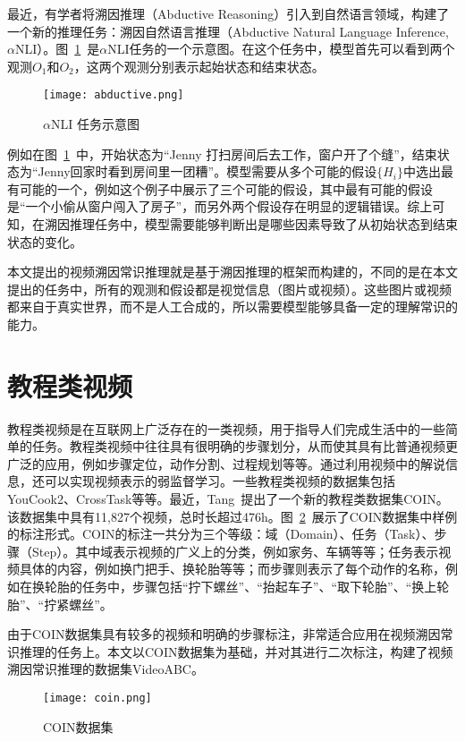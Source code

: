 最近，有学者将溯因推理（Abductive Reasoning）引入到自然语言领域，构建了一个新的推理任务：溯因自然语言推理\cite{bhagavatula2019abductive}（Abductive Natural Language Inference, $\alpha$NLI）。图~\ref{fig:aNLI}~是$\alpha$NLI任务的一个示意图。在这个任务中，模型首先可以看到两个观测$O_1$和$O_2$，这两个观测分别表示起始状态和结束状态。
\begin{figure}
    \centering
    \texttt{[image: abductive.png]}
    \caption{$\alpha$NLI 任务\cite{bhagavatula2019abductive}示意图}
    \label{fig:aNLI}
\end{figure}
例如在图~\ref{fig:aNLI}~中，开始状态为“Jenny 打扫房间后去工作，窗户开了个缝”，结束状态为“Jenny回家时看到房间里一团糟”。模型需要从多个可能的假设$\{H_i\}$中选出最有可能的一个，例如这个例子中展示了三个可能的假设，其中最有可能的假设是“一个小偷从窗户闯入了房子”，而另外两个假设存在明显的逻辑错误。综上可知，在溯因推理任务中，模型需要能够判断出是哪些因素导致了从初始状态到结束状态的变化。

本文提出的视频溯因常识推理就是基于溯因推理的框架而构建的，不同的是在本文提出的任务中，所有的观测和假设都是视觉信息（图片或视频）。这些图片或视频都来自于真实世界，而不是人工合成的，所以需要模型能够具备一定的理解常识的能力。
\section{教程类视频}
教程类视频是在互联网上广泛存在的一类视频，用于指导人们完成生活中的一些简单的任务。教程类视频中往往具有很明确的步骤划分，从而使其具有比普通视频更广泛的应用，例如步骤定位，动作分割、过程规划等等。通过利用视频中的解说信息，还可以实现视频表示的弱监督学习\cite{miech2019end}。一些教程类视频的数据集包括YouCook2\cite{zhou2018towards}、CrossTask\cite{zhukov2019cross}等等。最近，Tang~\etal\cite{tang2019coin}提出了一个新的教程类数据集COIN。该数据集中具有11,827个视频，总时长超过476h。图~\ref{fig:coin}~展示了COIN数据集中样例的标注形式。COIN的标注一共分为三个等级：域（Domain）、任务（Task）、步骤（Step）。其中域表示视频的广义上的分类，例如家务、车辆等等；任务表示视频具体的内容，例如换门把手、换轮胎等等；而步骤则表示了每个动作的名称，例如在换轮胎的任务中，步骤包括“拧下螺丝”、“抬起车子”、“取下轮胎”、“换上轮胎”、“拧紧螺丝”。

由于COIN数据集具有较多的视频和明确的步骤标注，非常适合应用在视频溯因常识推理的任务上。本文以COIN数据集为基础，并对其进行二次标注，构建了视频溯因常识推理的数据集VideoABC。

\begin{figure}[]
    \centering
    \texttt{[image: coin.png]}
    \caption{COIN数据集\cite{tang2019coin}}
    \label{fig:coin}
\end{figure}
